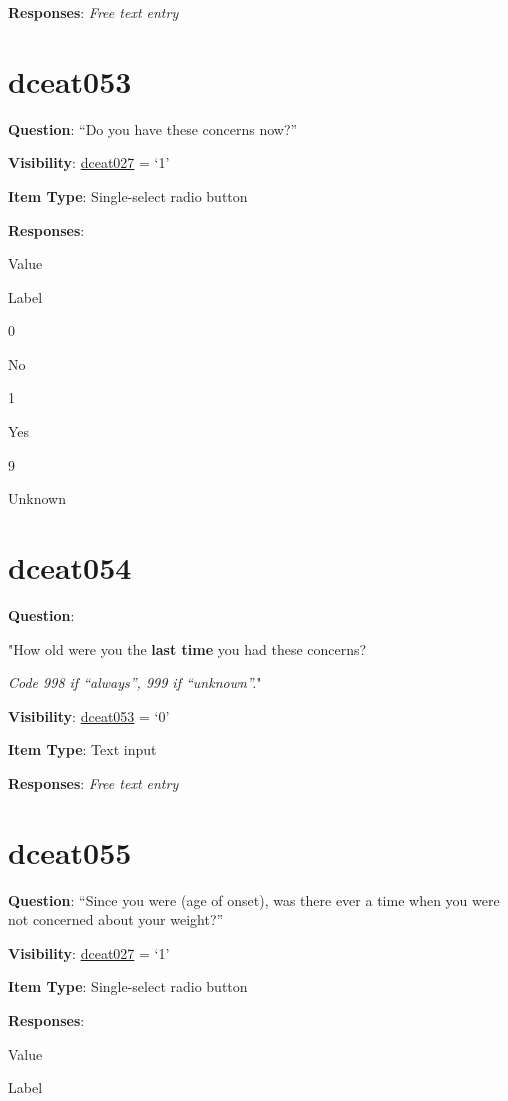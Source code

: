 \documentclass[]{book}
\begin{document}
\textbf{Responses}: \emph{Free text entry}

\hypertarget{dceat053}{%
\section{dceat053}\label{dceat053}}

\textbf{Question}: ``Do you have these concerns now?''

\textbf{Visibility}: \protect\hyperlink{dceat027}{dceat027} = `1'

\textbf{Item Type}: Single-select radio button

\textbf{Responses}:

Value

Label

0

No

1

Yes

9

Unknown

\hypertarget{dceat054}{%
\section{dceat054}\label{dceat054}}

\textbf{Question}:

"How old were you the \textbf{last time} you had these concerns?

\emph{Code 998 if ``always'', 999 if ``unknown''.}"

\textbf{Visibility}: \protect\hyperlink{dceat053}{dceat053} = `0'

\textbf{Item Type}: Text input

\textbf{Responses}: \emph{Free text entry}

\hypertarget{dceat055}{%
\section{dceat055}\label{dceat055}}

\textbf{Question}: ``Since you were (age of onset), was there ever a time when you were not concerned about your weight?''

\textbf{Visibility}: \protect\hyperlink{dceat027}{dceat027} = `1'

\textbf{Item Type}: Single-select radio button

\textbf{Responses}:

Value

Label
\end{document}
